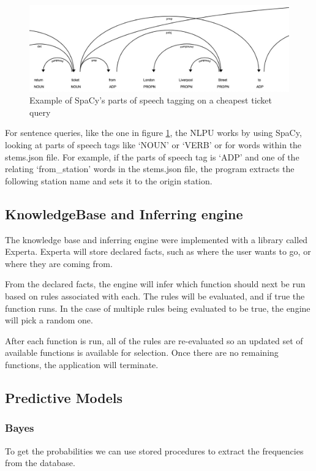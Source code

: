 \documentclass[11pt]{article}
\begin{document}
	\begin{figure}[!htb]
		\begin{center}
			\includegraphics[width=1\textwidth]{Resources/partsOfSpeechLarge.jpeg}
			\caption{Example of SpaCy's parts of speech tagging on a cheapest ticket query}
			\label{Img:Spacy}
		\end{center}
	\end{figure}
	
	For sentence queries, like the one in figure \ref{Img:Spacy}, the NLPU works by using SpaCy, looking at parts of speech tags like `NOUN' or `VERB' or for words within the stems.json file. For example, if the parts of speech tag is `ADP' and one of the relating `from\_station' words in the stems.json file, the program extracts the following station name and sets it to the origin station. 
	
	\subsection{KnowledgeBase and Inferring engine}
	The knowledge base and inferring engine were implemented with a library called Experta. Experta will store declared facts, such as where the user wants to go, or where they are coming from.
	
	From the declared facts, the engine will infer which function should next be run based on rules associated with each. The rules will be evaluated, and if true the function runs. In the case of multiple rules being evaluated to be true, the engine will pick a random one.
	
	After each function is run, all of the rules are re-evaluated so an updated set of available functions is available for selection. Once there are no remaining functions, the application will terminate.	
		
	\subsection{Predictive Models}
	
	\subsubsection{Bayes}
	To get the probabilities we can use stored procedures to extract the frequencies from the database.
	
\end{document}
